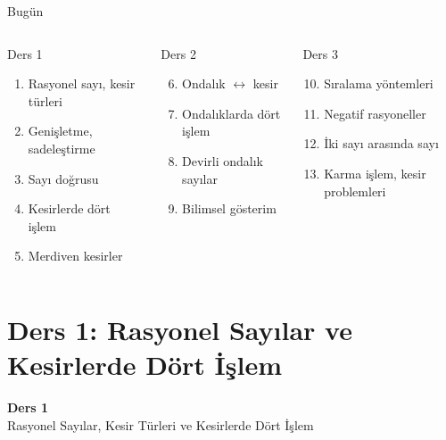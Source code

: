 \documentclass[aspectratio=169,11pt]{beamer}
\begin{document}
\begin{frame}{Bugün}
\begin{columns}[t]
\begin{block}{Ders 1}
\begin{enumerate}
\item Rasyonel sayı, kesir türleri
\item Genişletme, sadeleştirme
\item Sayı doğrusu
\item Kesirlerde dört işlem
\item Merdiven kesirler
\end{enumerate}
\end{block}
\begin{block}{Ders 2}
\begin{enumerate}\setcounter{enumi}{5}
\item Ondalık \(\leftrightarrow\) kesir
\item Ondalıklarda dört işlem
\item Devirli ondalık sayılar
\item Bilimsel gösterim
\end{enumerate}
\end{block}
\begin{block}{Ders 3}
\begin{enumerate}\setcounter{enumi}{9}
\item Sıralama yöntemleri
\item Negatif rasyoneller
\item İki sayı arasında sayı
\item Karma işlem, kesir problemleri
\end{enumerate}
\end{block}
\end{columns}
\end{frame}

\section{Ders 1: Rasyonel Sayılar ve Kesirlerde Dört İşlem}
\begin{frame}
\centering\Large\color{anamavi}\textbf{Ders 1}\\[6pt]\normalsize Rasyonel Sayılar, Kesir Türleri ve Kesirlerde Dört İşlem
\end{frame}
\end{document}
